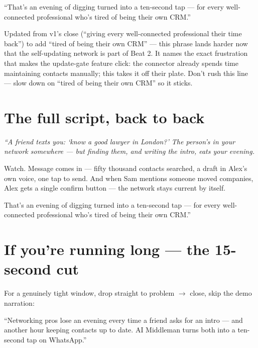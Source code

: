 \documentclass[11pt]{article}
\begin{document}
\begin{scriptbox}
``That's an evening of digging turned into a ten-second tap --- for every well-connected professional who's tired of being their own CRM.''
\end{scriptbox}

\begin{notebox}
Updated from v1's close (``giving every well-connected professional their time back'') to add ``tired of being their own CRM'' --- this phrase lands harder now that the self-updating network is part of Beat 2. It names the exact frustration that makes the update-gate feature click: the connector already spends time maintaining contacts manually; this takes it off their plate. Don't rush this line --- slow down on ``tired of being their own CRM'' so it sticks.
\end{notebox}

\section{The full script, back to back}

\begin{tcolorbox}[colback=gray!5,colframe=isazipink,title={\textbf{Read this straight through, no pauses between beats}},fonttitle=\bfseries,boxrule=1pt,arc=3pt]
\itshape
``A friend texts you: `know a good lawyer in London?' The person's in your network somewhere --- but finding them, and writing the intro, eats your evening.

Watch. Message comes in --- fifty thousand contacts searched, a draft in Alex's own voice, one tap to send. And when Sam mentions someone moved companies, Alex gets a single confirm button --- the network stays current by itself.

That's an evening of digging turned into a ten-second tap --- for every well-connected professional who's tired of being their own CRM.''
\end{tcolorbox}

\section{If you're running long --- the 15-second cut}

For a genuinely tight window, drop straight to problem $\to$ close, skip the demo narration:

\begin{scriptbox}
``Networking pros lose an evening every time a friend asks for an intro --- and another hour keeping contacts up to date. AI Middleman turns both into a ten-second tap on WhatsApp.''
\end{scriptbox}
\end{document}
